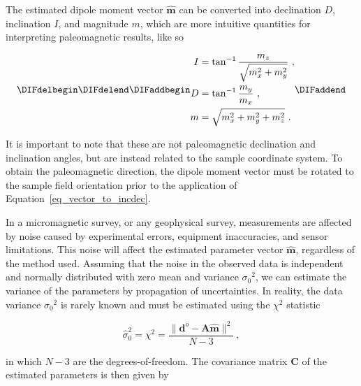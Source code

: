 \noindent
The estimated dipole moment vector $\hat{\mathbf{m}}$ can be converted into declination $D$, inclination $I$, and magnitude $m$, which are more intuitive quantities for interpreting paleomagnetic results, like so \citep{Tauxe2018}

\begin{equation}
\label{eq_vector_to_incdec}
\DIFdelbegin %
\DIFdelend \DIFaddbegin \begin{aligned}
I &= \tan^{-1}\dfrac{m_z}{\sqrt{m_x^2 + m_y^2}} \ , \\
D &= \tan^{-1}\dfrac{m_y}{m_x} \ , \\
m &= \sqrt{m_x^2 + m_y^2 + m_z^2} \ .
\end{aligned}\DIFaddend 
\end{equation}

\noindent
It is important to note that these are not paleomagnetic declination and inclination angles, but are instead related to the sample coordinate system. To obtain the paleomagnetic direction, the dipole moment vector must be rotated to the sample field orientation prior to the application of Equation~\ref{eq_vector_to_incdec}.

In a micromagnetic survey, or any geophysical survey, measurements are affected by noise caused by experimental errors, equipment inaccuracies, and sensor limitations. This noise will affect the estimated parameter vector $\mathbf{\hat{m}}$, regardless of the method used. Assuming that the noise in the observed data is independent and normally distributed with zero mean and variance ${\sigma_0}^2$, we can estimate the variance of the parameters by propagation of uncertainties. In reality, the data variance  ${\sigma_0}^2$ is rarely known and must be estimated using the $\chi^2$ statistic \citep{Aster2019}

\begin{equation}
\label{eq_chi_square}
\hat{\sigma}_0^2 = {\chi}^2 = \dfrac{\|\mathbf{d}^o - \mathbf{A}\hat{\mathbf{m}}\|^2}{N - 3}\ ,
\end{equation}

\noindent
in which $N - 3$  are the degrees-of-freedom.
The covariance matrix $\mathbf{C}$ of the estimated parameters is then given by \citep{Aster2019}

